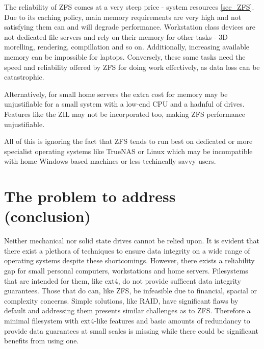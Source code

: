         The reliability of ZFS comes at a very steep price - system resources
        \ref{sec_ZFS}. Due to its caching policy, main memory requirements are
        very high and not satisfying them can and will degrade performance.
        Workstation class devices are not dedicated file servers and rely on
        their memory for other tasks - 3D morelling, rendering, compillation
        and so on. Additionally, increasing available memory can be impossible
        for laptops. Conversely, these same tasks need the speed and
        reliability offered by ZFS for doing work effectively, as data loss can
        be catastrophic.

        Alternatively, for small home servers the extra cost for memory may be
        unjustifiable for a small system with a low-end CPU and a hadnful of
        drives. Features like the ZIL may not be incorporated too, making ZFS
        performance unjustifiable.

        All of this is ignoring the fact that ZFS tends to run best on
        dedicated or more specialist operating systems like TrueNAS or Linux
        which may be incompatible with home Windows based machines or less
        techincally savvy users.

    \section{The problem to address (conclusion)}
        \label{sec_problem}

        Neither mechanical nor solid state drives cannot be relied upon. It is
        evident that there exist a plethora of techniques to ensure data
        integrity on a wide range of operating systems despite these
        shortcomings. However, there exists a reliability gap for small
        personal computers, workstations and home servers. Filesystems that are
        intended for them, like ext4, do not provide sufficent data integrity
        guarantees. Those that do can, like ZFS, be infeasible due to
        financial, spacial or complexity concerns. Simple solutions, like RAID,
        have significant flaws by default and addressing them presents similar
        challenges as to ZFS. Therefore a minimal filesystem with ext4-like
        features and basic amounts of redundancy to provide data guarantees at
        small scales is missing while there could be significant benefits from
        using one.
